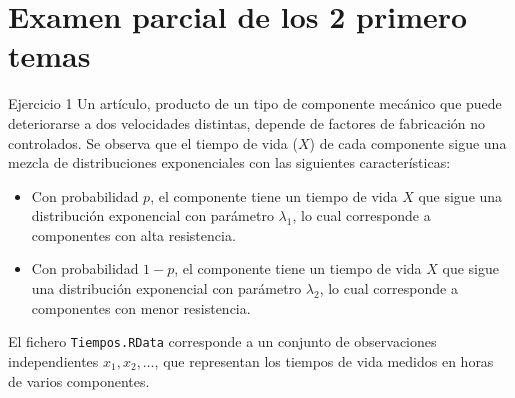 \section{Examen parcial de los 2 primero temas}

Ejercicio 1  
Un artículo, producto de un tipo de componente mecánico que puede deteriorarse a dos velocidades distintas, depende de factores de fabricación no controlados.  
Se observa que el tiempo de vida ($X$) de cada componente sigue una mezcla de distribuciones exponenciales con las siguientes características:

\begin{itemize}
    \item Con probabilidad \(p\), el componente tiene un tiempo de vida \(X\) que sigue una distribución exponencial con parámetro \(\lambda_1\), lo cual corresponde a componentes con alta resistencia.
    \item Con probabilidad \(1-p\), el componente tiene un tiempo de vida \(X\) que sigue una distribución exponencial con parámetro \(\lambda_2\), lo cual corresponde a componentes con menor resistencia.
\end{itemize}

El fichero \texttt{Tiempos.RData} corresponde a un conjunto de observaciones independientes \(x_1, x_2, \dots \), que representan los tiempos de vida medidos en horas de varios componentes.

